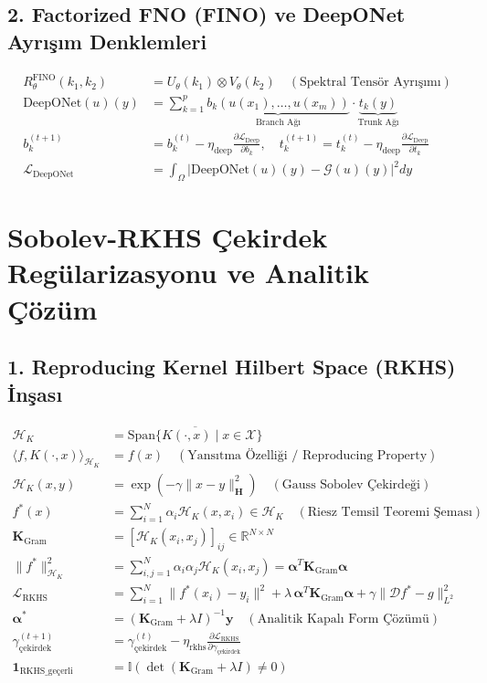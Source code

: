 \documentclass[11pt, a4paper]{article}
\begin{document}
\subsection{2. Factorized FNO (FINO) ve DeepONet Ayrışım Denklemleri}
\begin{align}
R_\theta^{\text{FINO}}(k_1, k_2) &= U_\theta(k_1) \otimes V_\theta(k_2) \quad (\text{Spektral Tensör Ayrışımı}) \\
\text{DeepONet}(u)(y) &= \sum_{k=1}^p \underbrace{b_k(u(x_1), \dots, u(x_m))}_{\text{Branch Ağı}} \cdot \underbrace{t_k(y)}_{\text{Trunk Ağı}} \\
b_k^{(t+1)} &= b_k^{(t)} - \eta_{\text{deep}} \frac{\partial \mathcal{L}_{\text{Deep}}}{\partial b_k}, \quad t_k^{(t+1)} = t_k^{(t)} - \eta_{\text{deep}} \frac{\partial \mathcal{L}_{\text{Deep}}}{\partial t_k} \\
\mathcal{L}_{\text{DeepONet}} &= \int_{\Omega} \left| \text{DeepONet}(u)(y) - \mathcal{G}(u)(y) \right|^2 dy
\end{align}

\section{Sobolev-RKHS Çekirdek Regülarizasyonu ve Analitik Çözüm}

\subsection{1. Reproducing Kernel Hilbert Space (RKHS) İnşası}
\begin{align}
\mathcal{H}_K &= \overline{\text{Span}\{ K(\cdot, x) \mid x \in \mathcal{X} \}} \\
\langle f, K(\cdot, x) \rangle_{\mathcal{H}_K} &= f(x) \quad (\text{Yansıtma Özelliği / Reproducing Property}) \\
\mathcal{H}_K(x, y) &= \exp\left( -\gamma \|x - y\|_{\mathbf{H}}^2 \right) \quad (\text{Gauss Sobolev Çekirdeği}) \\
f^*(x) &= \sum_{i=1}^N \alpha_i \mathcal{H}_K(x, x_i) \in \mathcal{H}_K \quad (\text{Riesz Temsil Teoremi Şeması}) \\
\mathbf{K}_{\text{Gram}} &= \left[ \mathcal{H}_K(x_i, x_j) \right]_{ij} \in \mathbb{R}^{N \times N} \\
\|f^*\|_{\mathcal{H}_K}^2 &= \sum_{i,j=1}^N \alpha_i \alpha_j \mathcal{H}_K(x_i, x_j) = \bm{\alpha}^T \mathbf{K}_{\text{Gram}} \bm{\alpha} \\
\mathcal{L}_{\text{RKHS}} &= \sum_{i=1}^N \|f^*(x_i) - y_i\|^2 + \lambda \, \bm{\alpha}^T \mathbf{K}_{\text{Gram}} \bm{\alpha} + \gamma \|\mathcal{D} f^* - g\|_{L^2}^2 \\
\bm{\alpha}^* &= (\mathbf{K}_{\text{Gram}} + \lambda I)^{-1} \mathbf{y} \quad (\text{Analitik Kapalı Form Çözümü}) \\
\gamma_{\text{çekirdek}}^{(t+1)} &= \gamma_{\text{çekirdek}}^{(t)} - \eta_{\text{rkhs}} \frac{\partial \mathcal{L}_{\text{RKHS}}}{\partial \gamma_{\text{çekirdek}}} \\
\mathbf{1}_{\text{RKHS\_geçerli}} &= \mathbb{I}\left( \det(\mathbf{K}_{\text{Gram}} + \lambda I) \ne 0 \right)
\end{align}
\end{document}
